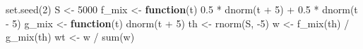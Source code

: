 \documentclass[
  letterpaper,
  DIV=11,
  numbers=noendperiod]{scrreprt}
\newenvironment{Shaded}{\begin{snugshade}}{\end{snugshade}}
\newcommand{\ControlFlowTok}[1]{\textcolor[rgb]{0.00,0.23,0.31}{\textbf{#1}}}
\newcommand{\DecValTok}[1]{\textcolor[rgb]{0.68,0.00,0.00}{#1}}
\newcommand{\FloatTok}[1]{\textcolor[rgb]{0.68,0.00,0.00}{#1}}
\newcommand{\FunctionTok}[1]{\textcolor[rgb]{0.28,0.35,0.67}{#1}}
\newcommand{\NormalTok}[1]{\textcolor[rgb]{0.00,0.23,0.31}{#1}}
\newcommand{\OtherTok}[1]{\textcolor[rgb]{0.00,0.23,0.31}{#1}}
\newcommand{\SpecialCharTok}[1]{\textcolor[rgb]{0.37,0.37,0.37}{#1}}
\begin{document}
\begin{Shaded}
\begin{Highlighting}[]
\FunctionTok{set.seed}\NormalTok{(}\DecValTok{2}\NormalTok{)}
\NormalTok{S }\OtherTok{\textless{}{-}} \DecValTok{5000}
\NormalTok{f\_mix }\OtherTok{\textless{}{-}} \ControlFlowTok{function}\NormalTok{(t) }\FloatTok{0.5} \SpecialCharTok{*} \FunctionTok{dnorm}\NormalTok{(t }\SpecialCharTok{+} \DecValTok{5}\NormalTok{) }\SpecialCharTok{+} \FloatTok{0.5} \SpecialCharTok{*} \FunctionTok{dnorm}\NormalTok{(t }\SpecialCharTok{{-}} \DecValTok{5}\NormalTok{)}
\NormalTok{g\_mix }\OtherTok{\textless{}{-}} \ControlFlowTok{function}\NormalTok{(t) }\FunctionTok{dnorm}\NormalTok{(t }\SpecialCharTok{+} \DecValTok{5}\NormalTok{)}
\NormalTok{th }\OtherTok{\textless{}{-}} \FunctionTok{rnorm}\NormalTok{(S, }\SpecialCharTok{{-}}\DecValTok{5}\NormalTok{)}
\NormalTok{w  }\OtherTok{\textless{}{-}} \FunctionTok{f\_mix}\NormalTok{(th) }\SpecialCharTok{/} \FunctionTok{g\_mix}\NormalTok{(th)}
\NormalTok{wt }\OtherTok{\textless{}{-}}\NormalTok{ w }\SpecialCharTok{/} \FunctionTok{sum}\NormalTok{(w)}


\end{Highlighting}
\end{Shaded}
\end{document}

